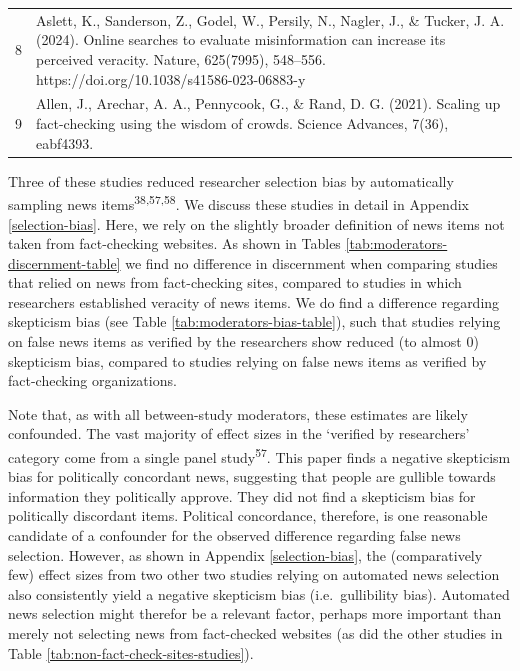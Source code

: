 \documentclass[
  doc,floatsintext]{apa6}
\begin{document}
\begin{table}[tbp]
\begin{center}
\begin{threeparttable}
{\begin{tabular}{lm{16cm}}
8 & Aslett, K., Sanderson, Z., Godel, W., Persily, N., Nagler, J., \& Tucker, J. A. (2024). Online searches to evaluate misinformation can increase its perceived veracity. Nature, 625(7995), 548–556. https://doi.org/10.1038/s41586-023-06883-y\\
9 & Allen, J., Arechar, A. A., Pennycook, G., \& Rand, D. G. (2021). Scaling up fact-checking using the wisdom of crowds. Science Advances, 7(36), eabf4393.\\
\bottomrule
\end{tabular}

}

\end{threeparttable}
\end{center}

\end{table}

Three of these studies reduced researcher selection bias by automatically sampling news items\textsuperscript{38,57,58}. We discuss these studies in detail in Appendix \ref{selection-bias}. Here, we rely on the slightly broader definition of news items not taken from fact-checking websites. As shown in Tables \ref{tab:moderators-discernment-table} we find no difference in discernment when comparing studies that relied on news from fact-checking sites, compared to studies in which researchers established veracity of news items. We do find a difference regarding skepticism bias (see Table \ref{tab:moderators-bias-table}), such that studies relying on false news items as verified by the researchers show reduced (to almost 0) skepticism bias, compared to studies relying on false news items as verified by fact-checking organizations.

Note that, as with all between-study moderators, these estimates are likely confounded. The vast majority of effect sizes in the `verified by researchers' category come from a single panel study\textsuperscript{57}. This paper finds a negative skepticism bias for politically concordant news, suggesting that people are gullible towards information they politically approve. They did not find a skepticism bias for politically discordant items. Political concordance, therefore, is one reasonable candidate of a confounder for the observed difference regarding false news selection. However, as shown in Appendix \ref{selection-bias}, the (comparatively few) effect sizes from two other two studies relying on automated news selection also consistently yield a negative skepticism bias (i.e.~gullibility bias). Automated news selection might therefor be a relevant factor, perhaps more important than merely not selecting news from fact-checked websites (as did the other studies in Table \ref{tab:non-fact-check-sites-studies}).
\end{document}
